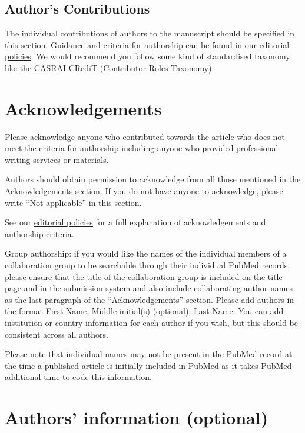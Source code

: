 \documentclass[a4paper,num-refs]{oup-contemporary}
\begin{document}
\subsection{Author's Contributions}

The individual contributions of authors to the manuscript should be specified in this section. Guidance and criteria for authorship can be found in our \href{https://academic.oup.com/gigascience/pages/editorial_policies_and_reporting_standards}{editorial policies}. We would recommend you follow some kind of standardised taxonomy like the \href{http://docs.casrai.org/CRediT}{CASRAI CRediT} (Contributor Roles Taxonomy).


\section{Acknowledgements}

Please acknowledge anyone who contributed towards the article who does not meet the criteria for authorship including anyone who provided professional writing services or materials.

Authors should obtain permission to acknowledge from all those mentioned in the Acknowledgements section. If you do not have anyone to acknowledge, please write ``Not applicable'' in this section.

See our \href{https://academic.oup.com/gigascience/pages/editorial_policies_and_reporting_standards}{editorial policies} for a full explanation of acknowledgements and authorship criteria.

Group authorship: if you would like the names of the individual members of a collaboration group to be searchable through their individual PubMed records, please ensure that the title of the collaboration group is included on the title page and in the submission system and also include collaborating author names as the last paragraph of the “Acknowledgements” section. Please add authors in the format First Name, Middle initial(s) (optional), Last Name. You can add institution or country information for each author if you wish, but this should be consistent across all authors.

Please note that individual names may not be present in the PubMed record at the time a published article is initially included in PubMed as it takes PubMed additional time to code this information.

\section{Authors' information (optional)}
\end{document}
